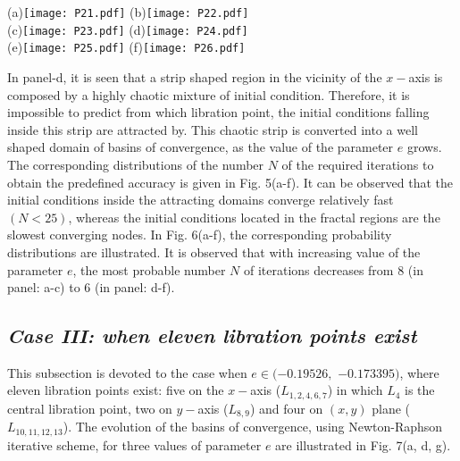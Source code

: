 \documentclass[preprint,fleqn,5p,numbers,sort&compress]{elsarticle}
\begin{document}
\begin{figure*}\label{Fig:7}
\begin{center}
(a)\texttt{[image: P21.pdf]}%
(b)\texttt{[image: P22.pdf]}\\%
(c)\texttt{[image: P23.pdf]}%
(d)\texttt{[image: P24.pdf]}\\%
(e)\texttt{[image: P25.pdf]}%
(f)\texttt{[image: P26.pdf]}%
\caption{The corresponding probability distributions of required number of iterations for obtaining the Newton-Raphson basins of convergence,
shown in Fig. \textcolor[rgb]{1.00,0.00,0.50}{4}(a-f). The vertical, dashed, red line indicates, in each case, the most probable number $N^*$ of iterations. (Color figure online).}
\end{center}
\end{figure*}
In panel-d, it is seen that a strip shaped region in the vicinity of the
$x-$axis is composed by a highly chaotic mixture of initial condition.
Therefore, it is impossible to predict from which libration point, the initial conditions
falling inside this strip are attracted by. This chaotic strip is converted into a
well shaped domain of basins of convergence, as the value of the parameter
$e$ grows.\\
The corresponding distributions of the number $N$ of the required iterations to obtain the
predefined accuracy is given in Fig. \textcolor[rgb]{1.00,0.00,0.50}{5}(a-f).
It can be observed that the initial conditions inside
the attracting domains converge relatively fast $(N < 25)$,
whereas the initial conditions located in
the fractal regions are the slowest converging nodes. In Fig. \textcolor[rgb]{1.00,0.00,0.50}{6}(a-f), the
corresponding probability distributions are illustrated. It is observed that with increasing value
of the parameter $e$, the most probable number $N$ of iterations decreases from 8 (in panel: a-c) to 6 (in panel: d-f).
\subsection{\emph{Case III: when eleven libration points exist}}
\label{sec:403}
This subsection is devoted to the case when $e \in (-0.19526,$ $ -0.173395)$, where eleven libration points exist:
five on the $x-$axis ($L_{1,2,4,6,7}$) in which $L_4$ is the central libration point, two on $y-$axis ($L_{8,9}$)
and four on $(x,y)$ plane ($L_{10, 11, 12, 13}$). The evolution of the basins of convergence, using
Newton-Raphson iterative scheme, for three values of parameter $e$ are illustrated in Fig. \textcolor[rgb]{1.00,0.00,0.50}{7}(a, d, g).
\end{document}
